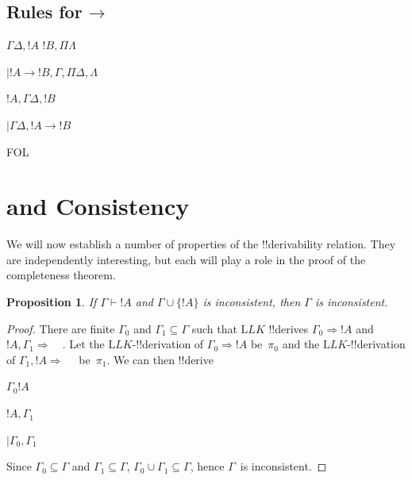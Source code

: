 \documentclass[10pt,a4paper]{article}
\theoremstyle{plain}
\newtheorem{prop}[thm]{Proposition}
\theoremstyle{definition}
\theoremstyle{remark}
\newcommand*{\olfileid}[3]{}
\newcommand*{\olsection}[1]{\section*{#1}}
\newcommand*{\ollabel}[1]{\label{#1}}
\providecommand{\AxiomC}[1]{}
\providecommand{\RightLabel}[1]{}
\providecommand{\DisplayProof}{}
\providecommand{\fCenter}{}
\newenvironment{prooftree}{}{}
\providecommand{\lif}{\mathbin{\rightarrow}}
\providecommand{\Sequent}{\mathrel{\Rightarrow}}
\providecommand{\Proves}{\mathrel{\vdash}}
\providecommand{\Log}{\ensuremath{\mathrm{L}}}
\providecommand{\iftag}[1]{#1}
\providecommand{\LeftR}[1]{}
\providecommand{\RightR}[1]{}
\providecommand{\Deduce}{\mathrm{D}}
\providecommand{\UnaryInf}{\ensuremath{\mid}}
\providecommand{\BinaryInf}{\ensuremath{\mid}}
\providecommand{\Cut}{\mathrm{Cut}}
\providecommand{\RightR}{\mathrm{R}}
\providecommand{\LeftR}{\mathrm{L}}
\providecommand{\Axiom}{\mathrm{Ax}}
\begin{document}
\subsection{Rules for $\lif$}

\begin{defish}
\Axiom$ \Gamma \fCenter \Delta, !A$
\Axiom$ !B, \Pi \fCenter \Lambda$
\RightLabel{\LeftR{\lif}}
\BinaryInf$ !A \lif !B, \Gamma, \Pi \fCenter \Delta, \Lambda$
\DisplayProof
\hfill
\Axiom$ !A, \Gamma \fCenter \Delta, !B$
\RightLabel{\RightR{\lif}}
\UnaryInf$ \Gamma \fCenter \Delta, !A \lif !B $
\DisplayProof
\end{defish}





\iftag{FOL}
      {\olfileid{fol}{seq}{prv}}
      {\olfileid{pl}{seq}{prv}}

\olsection{ and Consistency}

We will now establish a number of properties of the !!{derivability}
relation.  They are independently interesting, but each will play a
role in the proof of the completeness theorem.

\begin{prop}\ollabel{prop:provability-contr}
  If $\Gamma \Proves !A$ and $\Gamma \cup \{!A\}$ is
  inconsistent, then $\Gamma$ is inconsistent.
\end{prop}

\begin{proof}
There are finite $\Gamma_0$ and $\Gamma_1 \subseteq \Gamma$ such that
$\Log{LK}$ !!{derive}s $\Gamma_0 \Sequent !A$ and $!A, \Gamma_1
\Sequent \quad$.  Let the $\Log{LK}$-!!{derivation} of $\Gamma_0 \Sequent
!A$ be~$\pi_0$ and the $\Log{LK}$-!!{derivation} of $\Gamma_1, !A
\Sequent \quad$ be~$\pi_1$. We can then !!{derive}
\begin{prooftree}
\AxiomC{}
\RightLabel{$\pi_0$}
\Deduce$ \Gamma_0 \fCenter !A $
\AxiomC{}
\RightLabel{$\pi_1$}
\Deduce$!A, \Gamma_1 \fCenter $
\RightLabel{\Cut}
\BinaryInf$ \Gamma_0,\Gamma_1 \fCenter $
\end{prooftree}

Since $\Gamma_0 \subseteq \Gamma$ and $\Gamma_1 \subseteq \Gamma$,
$\Gamma_0 \cup \Gamma_1 \subseteq \Gamma$, hence $\Gamma$~is inconsistent.
\end{proof}
\end{document}
